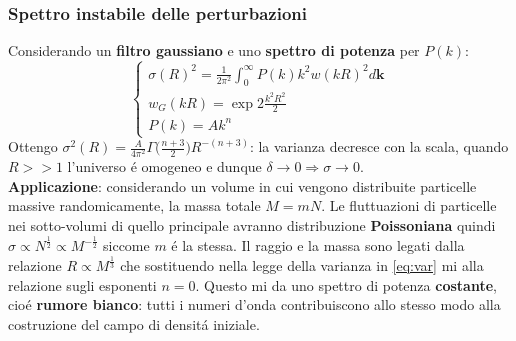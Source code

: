 \documentclass[12pt, a4paper]{article}
\begin{document}
\subsubsection{Spettro instabile delle perturbazioni}
Considerando un \textbf{filtro gaussiano} e uno \textbf{spettro di potenza} per $P(k)$:
\begin{equation}
\begin{cases}
\sigma(R)^2= \frac{1}{2\pi^2}\int_0^{\infty} P(k) k^2 w(kR)^2  d\textbf{k}
\\
w_G(kR)=\exp{2\frac{k^2R^2}{2}}
\\
P(k)= Ak^n
\end{cases}
\label{eq:var}
\end{equation}
Ottengo $\sigma^2(R)=\frac{A}{4\pi^2}\Gamma\big(\frac{n+3}{2}\big)R^{-(n+3)}$: la varianza decresce con la scala, quando $R>>1$ l'universo \'{e} omogeneo e dunque $\delta\rightarrow 0 \Rightarrow \sigma\rightarrow 0$.\\
\textbf{Applicazione}: considerando un volume in cui vengono distribuite particelle massive randomicamente, la massa totale $M=mN$. Le fluttuazioni di particelle nei sotto-volumi di quello principale avranno distribuzione \textbf{Poissoniana} quindi $\sigma\propto N^{\frac{1}{2}}\propto M^{-\frac{1}{2}}$ siccome $m$ \'{e} la stessa. Il raggio e la massa sono legati dalla relazione $R\propto M^{\frac{1}{3}}$ che sostituendo nella legge della varianza in \ref{eq:var} mi  alla relazione sugli esponenti $n=0$. Questo mi da uno spettro di potenza \textbf{costante}, cio\'{e} \textbf{rumore bianco}: tutti i numeri d'onda contribuiscono allo stesso modo alla costruzione del campo di densit\'{a} iniziale.
\end{document}

